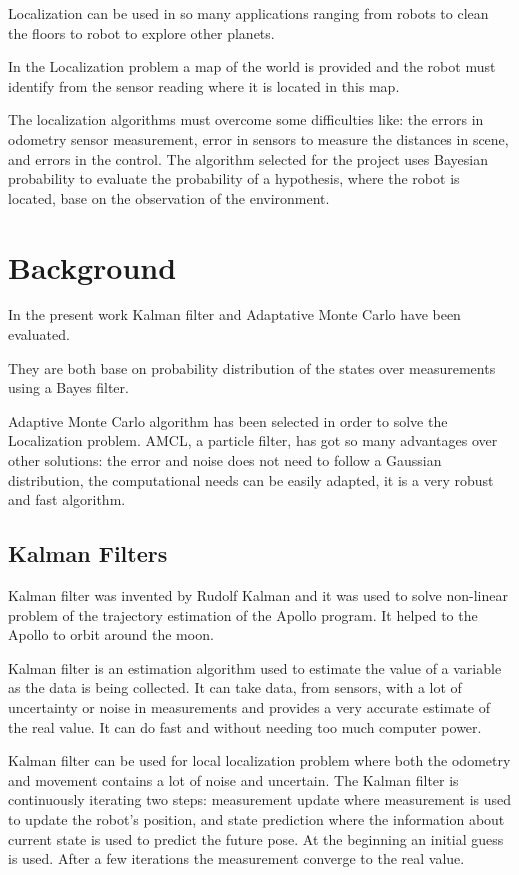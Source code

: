 \documentclass[10pt,journal,compsoc]{IEEEtran}
\begin{document}
Localization can be used in so many applications ranging from robots to clean the floors to robot to explore other planets.

In the Localization problem a map of the world is provided and the robot must identify from the sensor reading where it is located in this map.

The localization algorithms must overcome some difficulties like: the errors in odometry sensor measurement, error in sensors to measure the distances in scene, and errors in the control. The algorithm selected for the project uses Bayesian probability to evaluate the probability of a hypothesis, where the robot is located, base on the observation of the environment.

\section{Background}
In the present work Kalman filter and Adaptative Monte Carlo have been evaluated. 

They are both base on probability distribution of the states over measurements using a Bayes filter. 

Adaptive Monte Carlo algorithm has been selected in order to solve the Localization problem. AMCL, a particle filter, has got so many advantages over other solutions: the error and noise does not need to follow a Gaussian distribution, the computational needs can be easily adapted, it is a very robust and fast algorithm.\cite{probabilisticrobotics}\cite{robustmontecarlo}

\subsection{Kalman Filters}

Kalman filter was invented by Rudolf Kalman and it was used to solve non-linear problem of the trajectory estimation of the Apollo program. It helped to the Apollo to orbit around the moon. 

Kalman filter is an estimation algorithm used to estimate the value of a variable as the data is being collected. It can take data, from sensors, with a lot of uncertainty or noise in measurements and provides a very accurate estimate of the real value. It can do fast and without needing too much computer power. 

Kalman filter can be used for local localization problem where both the odometry and movement contains a lot of noise and uncertain. The Kalman filter is continuously iterating two steps: measurement update where measurement is used to update the robot's position, and state prediction where the information about current state is used to predict the future pose. At the beginning an initial guess is used. After a few iterations the measurement converge to the real value.
\end{document}
